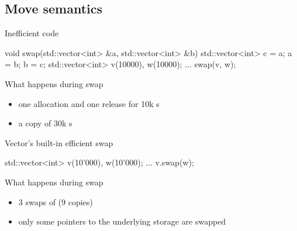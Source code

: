 \subsection[mv]{Move semantics}

\begin{frame}[fragile]
  \begin{exampleblock}{Inefficient code}
    \begin{cppcode*}{}
      void swap(std::vector<int> &a,
                std::vector<int> &b) {
        std::vector<int> c = a;
        a = b;
        b = c;
      }
      std::vector<int> v(10000), w(10000);
      ...
      swap(v, w);
    \end{cppcode*}
  \end{exampleblock}
  \pause
  \begin{alertblock}{What happens during swap}
    \begin{itemize}
    \item one allocation and one release for 10k s
    \item a copy of 30k s
    \end{itemize}
  \end{alertblock}
\end{frame}

\begin{frame}[fragile]
  \begin{exampleblock}{Vector's built-in efficient swap}
    \begin{cppcode*}{}
      std::vector<int> v(10'000), w(10'000);
      ...
      v.swap(w);
      \end{cppcode*}
  \end{exampleblock}
  \pause
  \begin{block}{What happens during swap}
    \begin{itemize}
    \item 3 swaps of  (9 copies)
    \item only some pointers to the underlying storage are swapped
    \end{itemize}
  \end{block}
\end{frame}

